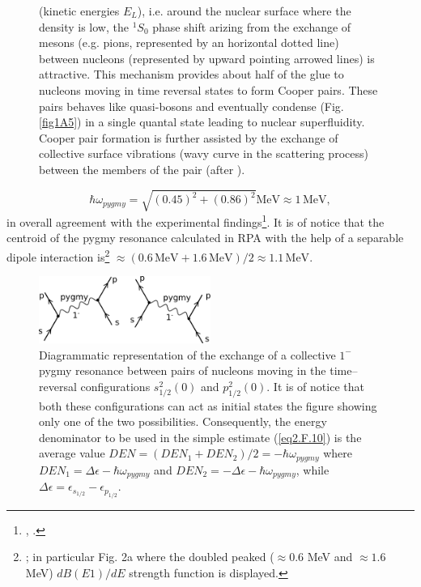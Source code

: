 \begin{figure}[h!]
{    (kinetic energies $E_L$), i.e. around the nuclear surface where the density is low, the $^1S_0$ phase shift arizing from the exchange of mesons (e.g. pions, represented by an horizontal dotted  line) between nucleons (represented by upward pointing arrowed lines)
    is attractive. This mechanism provides about half of the glue to nucleons moving in time reversal states to form Cooper pairs. These
    pairs behaves like quasi-bosons and eventually condense (Fig. \ref{fig1A5}) in a single quantal state leading to nuclear superfluidity. Cooper pair formation is
    further assisted by the exchange of collective surface vibrations (wavy curve in the scattering process) between the members of the
    pair (after \cite{Broglia:02d}).}\label{fig1F1}
  \end{figure}
\begin{equation}
\hbar \omega_{pygmy}=\sqrt{(0.45)^2+(0.86)^2}\text{MeV}\approx 1\, \text{MeV},
\end{equation}  
 in overall agreement with the experimental findings\footnote{\cite{Zinser:97}, \cite{Kanungo:15}.}. It is of notice that the centroid of the pygmy resonance calculated in  RPA with the help of a separable dipole interaction is\footnote{\cite{Barranco:01}; in particular  Fig. 2a where the doubled peaked ($\approx0.6$ MeV and $\approx1.6$ MeV) $dB(E1)/dE$ strength function is displayed.} $\approx (0.6\,\text{MeV}+ 1.6\, \text{MeV})/2\approx 1.1\, \text{MeV}$.
 \begin{figure}[h!]
 \centerline{\includegraphics*[width=0.5\textwidth,angle=0]{nutshell/figs/pigmy.pdf}}
 \caption{Diagrammatic representation of the exchange of a collective $1^-$ pygmy resonance between pairs of nucleons moving in the time--reversal configurations $s_{1/2}^2(0)$ and $p_{1/2}^2(0)$. It is of notice that both these configurations can act as initial states  the figure showing only one of the two possibilities. Consequently, the energy denominator to be used in the simple estimate (\ref{eq2.F.10}) is the average value $DEN=(DEN_1+DEN_2)/2=-\hbar\omega_{pygmy}$ where $DEN_1=\Delta \epsilon-\hbar\omega_{pygmy}$ and $DEN_2=-\Delta\epsilon-\hbar\omega_{pygmy}$, while $\Delta\epsilon=\epsilon_{s_{1/2}}-\epsilon_{p_{1/2}}$.}\label{pigmy}
 \end{figure}
